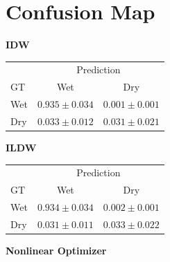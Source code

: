 \documentclass[11pt]{article}
\begin{document}
\section*{Confusion Map}
\begin{table}[H]
  \centering
  \begin{minipage}[t]{0.31\textwidth}
    \centering
    \textbf{IDW}

    \vspace{0.35em}
    \scriptsize
    \begin{tabular}{lcc}
      \toprule
       & \multicolumn{2}{c}{Prediction} \\
      GT & Wet & Dry \\
      \midrule
      Wet & $0.935 \pm 0.034$ & $0.001 \pm 0.001$ \\
      Dry & $0.033 \pm 0.012$ & $0.031 \pm 0.021$ \\
      \bottomrule
    \end{tabular}
  \end{minipage}
  \hfill
  \begin{minipage}[t]{0.31\textwidth}
    \centering
    \textbf{ILDW}

    \vspace{0.35em}
    \scriptsize
    \begin{tabular}{lcc}
      \toprule
       & \multicolumn{2}{c}{Prediction} \\
      GT & Wet & Dry \\
      \midrule
      Wet & $0.934 \pm 0.034$ & $0.002 \pm 0.001$ \\
      Dry & $0.031 \pm 0.011$ & $0.033 \pm 0.022$ \\
      \bottomrule
    \end{tabular}
  \end{minipage}
  \hfill
  \begin{minipage}[t]{0.31\textwidth}
    \centering
    \textbf{Nonlinear Optimizer}


\end{minipage}
\end{table}
\end{document}
